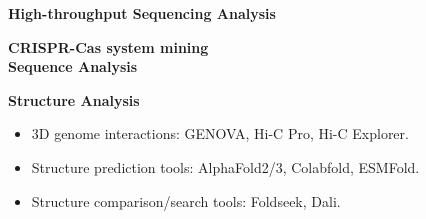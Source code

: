 \textbf{High-throughput Sequencing Analysis}
  
  
  
  

\textbf{CRISPR-Cas system mining}\\


\textbf{Sequence Analysis}

\textbf{Structure Analysis}
\begin{itemize}
    \item 3D genome interactions: GENOVA, Hi-C Pro, Hi-C Explorer.
    \item Structure prediction tools: AlphaFold2/3, Colabfold, ESMFold.
    \item Structure comparison/search tools: Foldseek, Dali.
\end{itemize}

